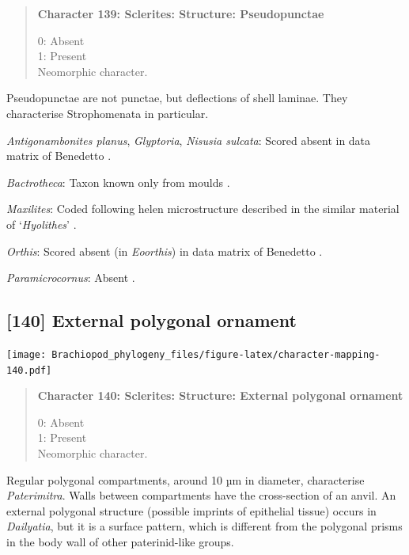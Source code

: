 \documentclass[openany]{book}
\begin{document}
\begin{quote}
\textbf{Character 139: Sclerites: Structure: Pseudopunctae}

0: Absent\\
1: Present\\
Neomorphic character.
\end{quote}

Pseudopunctae are not punctae, but deflections of shell laminae. They
characterise Strophomenata in particular.

\hypertarget{Antigonambonites_planus-coding-139}{}
\emph{Antigonambonites planus}, \emph{Glyptoria}, \emph{Nisusia
sulcata}: Scored absent in data matrix of Benedetto
\citeyearpar{Benedetto2009iChaniella}.

\hypertarget{Bactrotheca-coding-139}{}
\emph{Bactrotheca}: Taxon known only from moulds \citep{Valent2012}.

\hypertarget{Maxilites-coding-139}{}
\emph{Maxilites}: Coded following helen microstructure described in the
similar material of `\emph{Hyolithes}' \citep{MartiMus2007}.

\hypertarget{Orthis-coding-139}{}
\emph{Orthis}: Scored absent (in \emph{Eoorthis}) in data matrix of
Benedetto \citeyearpar{Benedetto2009iChaniella}.

\hypertarget{Paramicrocornus-coding-139}{}
\emph{Paramicrocornus}: Absent \citep{Zhang2018Ahyolithid}.

\subsection*{{[}140{]} External polygonal
ornament}\label{external-polygonal-ornament}

\texttt{[image: Brachiopod\_phylogeny\_files/figure-latex/character-mapping-140.pdf]}

\begin{quote}
\textbf{Character 140: Sclerites: Structure: External polygonal
ornament}

0: Absent\\
1: Present\\
Neomorphic character.
\end{quote}

Regular polygonal compartments, around 10 µm in diameter, characterise
\emph{Paterimitra}. Walls between compartments have the cross-section of
an anvil. An external polygonal structure (possible imprints of
epithelial tissue) occurs in \emph{Dailyatia}, but it is a surface
pattern, which is different from the polygonal prisms in the body wall
of other paterinid-like groups.
\end{document}
